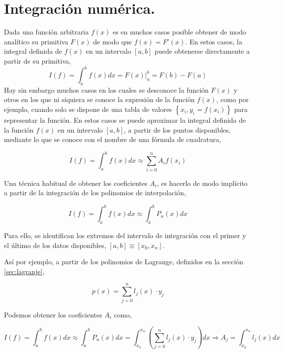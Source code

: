 \section{Integración numérica.}\label{sec:inum}

Dada una función arbitraria $f(x)$ es en muchos casos posible obtener de modo analítico su primitiva $F(x)$ de modo que $f(x)=F'(x)$. En estos casos, la integral definida de $f(x)$ en un intervalo $[a,b]$ puede obtenerse directamente a partir de su primitiva,
\begin{equation*}
I(f)=\int_a^bf(x)dx=F(x)\vert_a^b=F(b)-F(a)
\end{equation*}
Hay sin embargo muchos casos en los cuales se desconoce la función $F(x)$ y otros en los que ni siquiera se conoce la expresión de la función $f(x)$, como por ejemplo, cuando solo se dispone de una tabla de valores $\left\lbrace x_i,y_i=f(x_i) \right\rbrace$ para representar la función. En estos casos se puede aproximar la integral definida de la función $f(x)$ en un intervalo $[a,b]$, a partir de los puntos disponibles, mediante lo que se conoce con el nombre de una fórmula de cuadratura,

\begin{equation*}
I(f)=\int_a^bf(x)dx \approx \sum_{i=0}^nA_if(x_i)
\end{equation*}

Una técnica habitual de obtener los coeficientes $A_i$, es hacerlo de modo implícito a partir de la integración  de los polinomios de interpolación,

 \begin{equation*}
I(f)=\int_a^bf(x)dx \approx \int_a^bP_n(x)dx
\end{equation*}

Para ello, se identifican los extremos del intervalo de integración con el primer y el último de los datos disponibles, $[a,b]\equiv [x_0,x_n]$.

Así por ejemplo, a partir de los polinomios de Lagrange, definidos en la sección \ref{sec:lagranje},

\begin{equation*}
p(x)=\sum_{j=0}^n l_j(x)\cdot y_j
\end{equation*}

Podemos obtener los coeficientes $A_i$ como,

\begin{equation*}
I(f)=\int_a^bf(x)dx \approx \int_a^bP_n(x)dx=\int_{x_0}^{x_n}\left( \sum_{j=0}^n l_j(x)\cdot y_j \right) dx \Rightarrow A_j=\int_{x_0}^{x_n}l_j(x)dx
\end{equation*}

